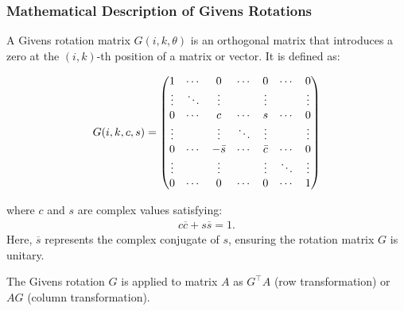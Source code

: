 \documentclass[12pt]{article}
\numberwithin{equation}{subsubsection}
\begin{document}
\subsubsection{Mathematical Description of Givens Rotations}

A Givens rotation matrix $ G(i, k, \theta) $ is an orthogonal matrix that introduces a zero at the $ (i, k) $-th position of a matrix or vector. It is defined as:

\begin{align}
G(i, k, c, s) = \begin{pmatrix}
	1      & \cdots & 0        & \cdots & 0       & \cdots & 0      \\
	\vdots & \ddots & \vdots   &        & \vdots  &        & \vdots \\
	0      & \cdots & c        & \cdots & s       & \cdots & 0      \\
	\vdots &        & \vdots   & \ddots & \vdots  &        & \vdots \\
	0      & \cdots & -\bar{s} & \cdots & \bar{c} & \cdots & 0      \\
	\vdots &        & \vdots   &        & \vdots  & \ddots & \vdots \\
	0      & \cdots & 0        & \cdots & 0       & \cdots & 1 \end{pmatrix}
\end{align}

where $ c $ and $ s $ are complex values satisfying:
\begin{align}
	c \overline{c} + s \overline{s} = 1.
\end{align}
Here, $ \overline{s} $ represents the complex conjugate of $ s $, ensuring the rotation matrix $ G $ is unitary.

The Givens rotation $ G $ is applied to matrix $ A $ as $ G^\top A $ (row transformation) or $ AG $ (column transformation).
\end{document}
